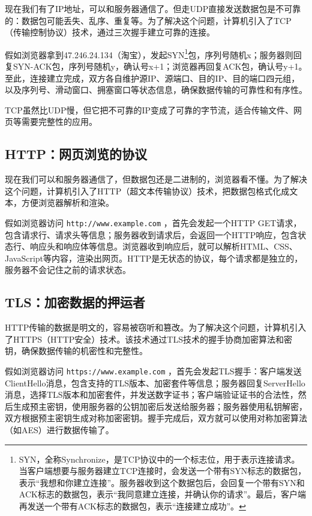 现在我们有了IP地址，可以和服务器通信了。但走UDP直接发送数据包是不可靠的：数据包可能丢失、乱序、重复等。为了解决这个问题，计算机引入了TCP（传输控制协议）技术，通过三次握手建立可靠的连接。

假如浏览器拿到47.246.24.134（淘宝），发起SYN\footnote{SYN，全称Synchronize，是TCP协议中的一个标志位，用于表示连接请求。当客户端想要与服务器建立TCP连接时，会发送一个带有SYN标志的数据包，表示“我想和你建立连接”。服务器收到这个数据包后，会回复一个带有SYN和ACK标志的数据包，表示“我同意建立连接，并确认你的请求”。最后，客户端再发送一个带有ACK标志的数据包，表示“连接建立成功”。}包，序列号随机x；服务器则回复SYN-ACK包，序列号随机y，确认号x+1；浏览器再回复ACK包，确认号y+1。至此，连接建立完成，双方各自维护源IP、源端口、目的IP、目的端口四元组，以及序列号、滑动窗口、拥塞窗口等状态信息，确保数据传输的可靠性和有序性。

TCP虽然比UDP慢，但它把不可靠的IP变成了可靠的字节流，适合传输文件、网页等需要完整性的应用。

\subsection{HTTP：网页浏览的协议}

现在我们可以和服务器通信了，但数据包还是二进制的，浏览器看不懂。为了解决这个问题，计算机引入了HTTP（超文本传输协议）技术，把数据包格式化成文本，方便浏览器解析和渲染。

假如浏览器访问 \texttt{http://www.example.com} ，首先会发起一个HTTP GET请求，包含请求行、请求头等信息；服务器收到请求后，会返回一个HTTP响应，包含状态行、响应头和响应体等信息。浏览器收到响应后，就可以解析HTML、CSS、JavaScript等内容，渲染出网页。HTTP是无状态的协议，每个请求都是独立的，服务器不会记住之前的请求状态。

\subsection{TLS：加密数据的押运者}

HTTP传输的数据是明文的，容易被窃听和篡改。为了解决这个问题，计算机引入了HTTPS（HTTP安全）技术。该技术通过TLS技术的握手协商加密算法和密钥，确保数据传输的机密性和完整性。

假如浏览器访问 \texttt{https://www.example.com} ，首先会发起TLS握手：客户端发送ClientHello消息，包含支持的TLS版本、加密套件等信息；服务器回复ServerHello消息，选择TLS版本和加密套件，并发送数字证书；客户端验证证书的合法性，然后生成预主密钥，使用服务器的公钥加密后发送给服务器；服务器使用私钥解密，双方根据预主密钥生成对称加密密钥。握手完成后，双方就可以使用对称加密算法（如AES）进行数据传输了。

